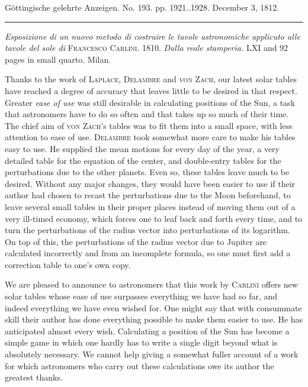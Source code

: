 \clearpage
{}
\hypertarget{native-548-lower}{}\label{native-548-lower}
\begin{center}\small Göttingische gelehrte Anzeigen. No. 193. pp. 1921..1928. December 3, 1812.\\[3pt]\rule{.72\linewidth}{.3pt}\end{center}

\emph{Esposizione di un nuovo metodo di costruire le tavole astronomiche applicuto alle tavole del sole di} \textsc{Francesco Carlini}. 1810. \emph{Dalla reale stamperia.} LXI and 92 pages in small quarto. Milan.

Thanks to the work of \textsc{Laplace}, \textsc{Delambre} and \textsc{von Zach}, our latest solar tables have reached a degree of accuracy that leaves little to be desired in that respect. Greater \emph{ease of use} was still desirable in calculating positions of the Sun, a task that astronomers have to do so often and that takes up so much of their time. The chief aim of \textsc{von Zach}'s tables was to fit them into a small space, with less attention to ease of use. \textsc{Delambre} took somewhat more care to make his tables easy to use. He supplied the mean motions for every day of the year, a very detailed table for the equation of the center, and double-entry tables for the perturbations due to the other planets. Even so, these tables leave much to be desired. Without any major changes, they would have been easier to use if their author had chosen to recast the perturbations due to the Moon beforehand, to leave several small tables in their proper places instead of moving them out of a very ill-timed economy, which forces one to leaf back and forth every time, and to turn the perturbations of the radius vector into perturbations of its logarithm. On top of this, the perturbations of the radius vector due to Jupiter are calculated incorrectly and from an incomplete formula, so one must first add a correction table to one's own copy.

We are pleased to announce to astronomers that this work by \textsc{Carlini} offers new solar tables whose ease of use surpasses everything we have had so far, and indeed everything we have even wished for. One might say that with consummate skill their author has done everything possible to make them easier to use. He has anticipated almost every wish. Calculating a position of the Sun has become a simple game in which one hardly has to write a single digit beyond what is absolutely necessary. We cannot help giving a somewhat fuller account of a work for which astronomers who carry out these calculations owe its author the greatest thanks.


